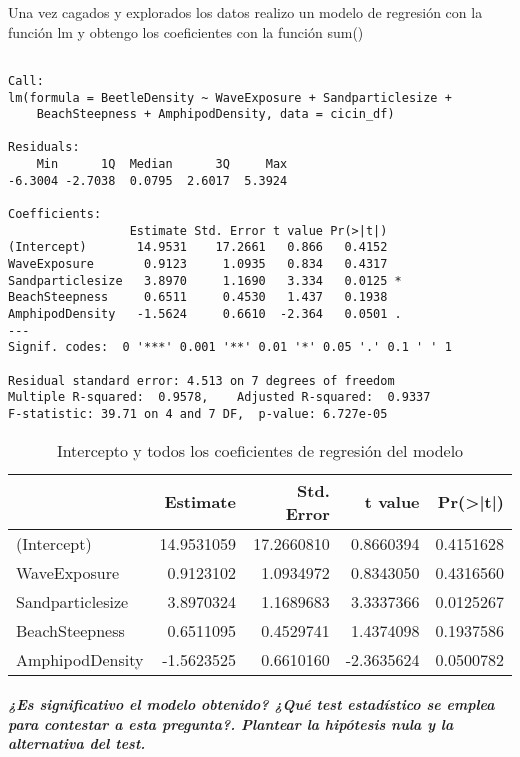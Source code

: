 \documentclass[
]{article}
\begin{document}
Una vez cagados y explorados los datos realizo un modelo de regresión
con la función lm y obtengo los coeficientes con la función sum()

\begin{verbatim}

Call:
lm(formula = BeetleDensity ~ WaveExposure + Sandparticlesize + 
    BeachSteepness + AmphipodDensity, data = cicin_df)

Residuals:
    Min      1Q  Median      3Q     Max 
-6.3004 -2.7038  0.0795  2.6017  5.3924 

Coefficients:
                 Estimate Std. Error t value Pr(>|t|)  
(Intercept)       14.9531    17.2661   0.866   0.4152  
WaveExposure       0.9123     1.0935   0.834   0.4317  
Sandparticlesize   3.8970     1.1690   3.334   0.0125 *
BeachSteepness     0.6511     0.4530   1.437   0.1938  
AmphipodDensity   -1.5624     0.6610  -2.364   0.0501 .
---
Signif. codes:  0 '***' 0.001 '**' 0.01 '*' 0.05 '.' 0.1 ' ' 1

Residual standard error: 4.513 on 7 degrees of freedom
Multiple R-squared:  0.9578,    Adjusted R-squared:  0.9337 
F-statistic: 39.71 on 4 and 7 DF,  p-value: 6.727e-05
\end{verbatim}

\begin{table}

\caption{\label{tab:unnamed-chunk-3}Intercepto y todos los coeficientes de regresión del modelo}
\centering
\begin{tabular}[t]{l|r|r|r|r}
\hline
  & Estimate & Std. Error & t value & Pr(>|t|)\\
\hline
(Intercept) & 14.9531059 & 17.2660810 & 0.8660394 & 0.4151628\\
\hline
WaveExposure & 0.9123102 & 1.0934972 & 0.8343050 & 0.4316560\\
\hline
Sandparticlesize & 3.8970324 & 1.1689683 & 3.3337366 & 0.0125267\\
\hline
BeachSteepness & 0.6511095 & 0.4529741 & 1.4374098 & 0.1937586\\
\hline
AmphipodDensity & -1.5623525 & 0.6610160 & -2.3635624 & 0.0500782\\
\hline
\end{tabular}
\end{table}

\hypertarget{es-significativo-el-modelo-obtenido-quuxe9-test-estaduxedstico-se-emplea-para-contestar-a-esta-pregunta.-plantear-la-hipuxf3tesis-nula-y-la-alternativa-del-test.}{%
\subparagraph{\texorpdfstring{\textbf{¿Es significativo el modelo
obtenido? ¿Qué test estadístico se emplea para contestar a esta
pregunta?. Plantear la hipótesis nula y la alternativa del
test.}}{¿Es significativo el modelo obtenido? ¿Qué test estadístico se emplea para contestar a esta pregunta?. Plantear la hipótesis nula y la alternativa del test.}}\label{es-significativo-el-modelo-obtenido-quuxe9-test-estaduxedstico-se-emplea-para-contestar-a-esta-pregunta.-plantear-la-hipuxf3tesis-nula-y-la-alternativa-del-test.}}
\end{document}
